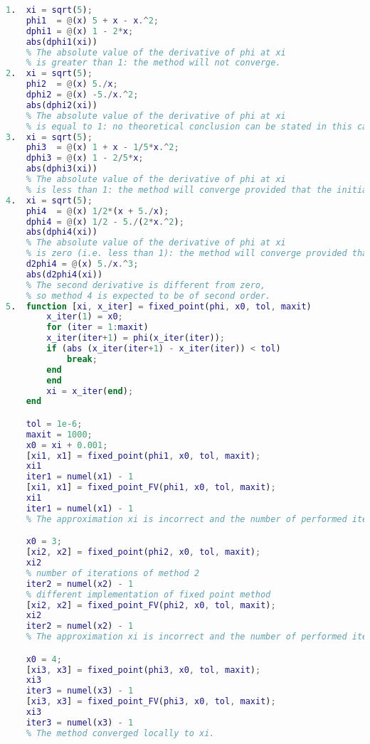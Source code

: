 \documentclass[12pt, a4paper]{report}
\newtheorem[style=M,bodystyle=\normalfont]{theorem}{Theorem}
\newtheorem[style=M,bodystyle=\normalfont]{corollary}{Corollary}
\newtheorem[style=M,bodystyle=\normalfont]{lemma}{Lemma}
\newtheorem[style=M,bodystyle=\normalfont]{definition}{Definition}
\begin{document}
    \begin{Answer}[ref=10]
        \begin{lstlisting}[language=Matlab]
1.  xi = sqrt(5);
    phi1  = @(x) 5 + x - x.^2;
    dphi1 = @(x) 1 - 2*x;
    abs(dphi1(xi))
    % The absolute value of the derivative of phi at xi
    % is greater than 1: the method will not converge.
2.  xi = sqrt(5);
    phi2  = @(x) 5./x;
    dphi2 = @(x) -5./x.^2;
    abs(dphi2(xi))
    % The absolute value of the derivative of phi at xi
    % is equal to 1: no theoretical conclusion can be stated in this case.
3.  xi = sqrt(5);
    phi3  = @(x) 1 + x - 1/5*x.^2;
    dphi3 = @(x) 1 - 2/5*x;
    abs(dphi3(xi))
    % The absolute value of the derivative of phi at xi
    % is less than 1: the method will converge provided that the initial guess x{(0)} is close enough to xi (local convergence).
4.  xi = sqrt(5);
    phi4  = @(x) 1/2*(x + 5./x);
    dphi4 = @(x) 1/2 - 5./(2*x.^2);
    abs(dphi4(xi))
    % The absolute value of the derivative of phi at xi
    % is zero (i.e. less than 1): the method will converge provided that the initial guess x{(0)} is close enough to xi (local convergence).
    d2phi4 = @(x) 5./x.^3;
    abs(d2phi4(xi))
    % The second derivative is different from zero,
    % so method 4 is expected to be of second order.
5.  function [xi, x_iter] = fixed_point(phi, x0, tol, maxit)
        x_iter(1) = x0;
        for (iter = 1:maxit)
        x_iter(iter+1) = phi(x_iter(iter));
        if (abs (x_iter(iter+1) - x_iter(iter)) < tol)
            break;
        end
        end
        xi = x_iter(end);
    end

    tol = 1e-6;
    maxit = 1000;
    x0 = xi + 0.001;
    [xi1, x1] = fixed_point(phi1, x0, tol, maxit);
    xi1
    iter1 = numel(x1) - 1
    [xi1, x1] = fixed_point_FV(phi1, x0, tol, maxit);
    xi1
    iter1 = numel(x1) - 1
    % The approximation xi is incorrect and the number of performed iterations is the maximum: as expected, the method did not converge.

    x0 = 3;
    [xi2, x2] = fixed_point(phi2, x0, tol, maxit);
    xi2
    % number of iterations of method 2
    iter2 = numel(x2) - 1
    % different implementation of fixed point method
    [xi2, x2] = fixed_point_FV(phi2, x0, tol, maxit);
    xi2
    iter2 = numel(x2) - 1
    % The approximation xi is incorrect and the number of performed iterations is the maximum: the method did not converge.

    x0 = 4;
    [xi3, x3] = fixed_point(phi3, x0, tol, maxit);
    xi3
    iter3 = numel(x3) - 1
    [xi3, x3] = fixed_point_FV(phi3, x0, tol, maxit);
    xi3
    iter3 = numel(x3) - 1
    % The method converged locally to xi.


\end{lstlisting}
\end{Answer}
\end{document}
